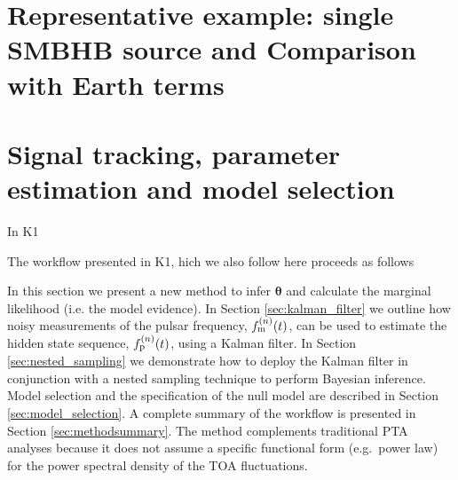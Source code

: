\documentclass[fleqn,usenatbib,useAMS]{mnras}
\begin{document}
\section{Representative example: single SMBHB source and Comparison with Earth terms}\label{sec:rep_example1}








\section{Signal tracking, parameter estimation and model selection} \label{sec:detect}








In K1 














The workflow presented in K1, hich we also follow here proceeds as follows











In this section we present a new method to infer $\boldsymbol{\theta}$ and calculate the marginal likelihood (i.e. the model evidence). In Section \ref{sec:kalman_filter} we outline how noisy measurements of the pulsar frequency, $f_{\rm m}^{(n)}(t)$, can be used to estimate the hidden state sequence, $f_{\rm p}^{(n)}(t)$, using a Kalman filter. In Section \ref{sec:nested_sampling} we demonstrate how to deploy the Kalman filter in conjunction with a nested sampling technique to perform Bayesian inference. Model selection and the specification of the null model are described in Section \ref{sec:model_selection}. A complete summary of the workflow is presented in Section \ref{sec:methodsummary}. The method complements traditional PTA analyses because it does not assume a specific functional form (e.g.\ power law) for the power spectral density of the TOA fluctuations.
\end{document}
